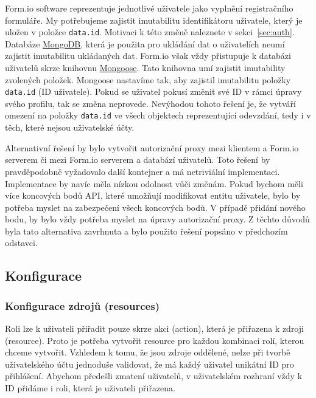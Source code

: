 Form.io software reprezentuje jednotlivé uživatele jako vyplnění registračního formuláře.
My potřebujeme zajistit imutabilitu identifikátoru uživatele, který je uložen v položce \texttt{data.id}.
Motivaci k této změně naleznete v sekci~\ref{sec:auth}.
Databáze \href{https://www.mongodb.com/}{MongoDB}, která je použita pro ukládání dat o uživatelích neumí zajistit imutabilitu ukládaných dat.
Form.io však vždy přistupuje k databázi uživatelů skrze knihovnu \href{https://mongoosejs.com/}{Mongoose}.
Tato knihovna umí zajistit imutability zvolených položek.
Mongoose nastavíme tak, aby zajistil imutabilitu položky \texttt{data.id} (ID uživatele).
Pokud se uživatel pokusí změnit své ID v rámci úpravy svého profilu, tak se změna neprovede.
Nevýhodou tohoto řešení je, že vytváří omezení na položky \texttt{data.id} ve všech objektech reprezentující odevzdání, tedy i v těch, které nejsou uživatelské účty.

Alternativní řešení by bylo vytvořit autorizační proxy mezi klientem a Form.io serverem či mezi Form.io serverem a databází uživatelů.
Toto řešení by pravděpodobně vyžadovalo další kontejner a má netriviální implementaci.
Implementace by navíc měla nízkou odolnost vůči změnám.
Pokud bychom měli více koncových bodů API, které umožňují modifikovat entitu uživatele, bylo by potřeba myslet na zabezpečení všech koncových bodů.
V případě přidání nového bodu, by bylo vždy potřeba myslet na úpravy autorizační proxy.
Z těchto důvodů byla tato alternativa zavrhnuta a bylo použito řešení popsáno v předchozím odstavci.

\subsection{Konfigurace}\label{subsec:konfigurace}

\subsubsection{Konfigurace zdrojů (resources)}\label{subsubsec:konfigurace-resources}

Roli lze k uživateli přiřadit pouze skrze akci (action), která je přiřazena k zdroji (resource).
Proto je potřeba vytvořit resource pro každou kombinaci rolí, kterou chceme vytvořit.
Vzhledem k tomu, že jsou zdroje oddělené, nelze při tvorbě uživatelského účtu jednoduše validovat, že má každý uživatel unikátní ID pro přihlášení.
Abychom předešli zmatení uživatelů, v uživatelském rozhraní vždy k ID přidáme i roli, která je uživateli přiřazena.

